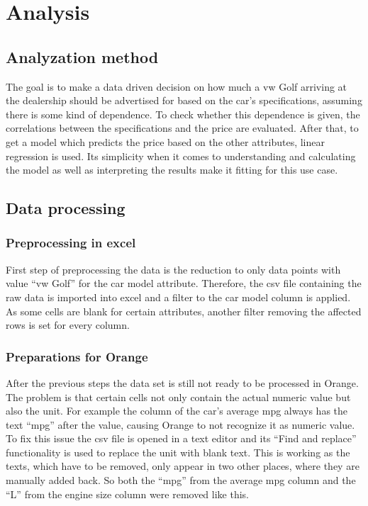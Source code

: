 \chapter{Analysis}
\section{Analyzation method}
The goal is to make a data driven decision on how much a \ac{vw} Golf arriving at the dealership should be advertised for
based on the car's specifications, assuming there is some kind of dependence.
To check whether this dependence is given, the correlations between the specifications and the price are evaluated.
After that, to get a model which predicts the price based on the other attributes, linear regression is used.
Its simplicity when it comes to understanding and calculating the model as well as interpreting the results make it fitting
for this use case.    

\section{Data processing}
\subsection{Preprocessing in \ac{excel}}
First step of preprocessing the data is the reduction to only data points with value \enquote{\ac{vw} Golf} for the car model attribute. Therefore, the \ac{csv} file containing the raw data is
imported into \ac{excel} and a filter to the car model column is applied. As some cells are blank for certain attributes, another filter removing the affected rows is set for every column. 

\subsection{Preparations for Orange}
After the previous steps the data set is still not ready to be processed in Orange. The problem is that certain cells not only contain the actual numeric value but also the 
unit. For example the column of the car's average \ac{mpg} always has the text \enquote{mpg} after the value, causing Orange to not recognize it as 
numeric value. To fix this issue the \ac{csv} file is opened in a text editor and its \enquote{Find and replace} functionality is used to replace the unit with blank text.
This is working as the texts,
which have to be removed, only appear in two other places, where they are manually added back. So both the \enquote{mpg} from the average \ac{mpg} column and the \enquote{L}
from the engine size column were removed like this.

